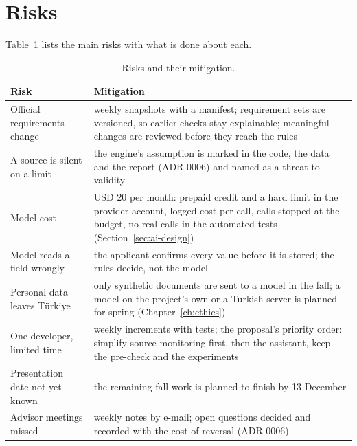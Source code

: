 \section{Risks}
Table~\ref{tab:risks} lists the main risks with what is done about each.

\begin{table}[ht]
  \centering
  \small
  \caption{Risks and their mitigation.}
  \label{tab:risks}
  \begin{tabularx}{\textwidth}{@{}>{\raggedright\arraybackslash}p{3.6cm}X@{}}
    \toprule
    Risk & Mitigation \\
    \midrule
    Official requirements change & weekly snapshots with a manifest; requirement sets are
      versioned, so earlier checks stay explainable; meaningful changes are reviewed before they
      reach the rules \\
    A source is silent on a limit & the engine's assumption is marked in the code, the data and
      the report (ADR 0006) and named as a threat to validity \\
    Model cost & USD 20 per month: prepaid credit and a hard limit in the provider account, logged cost per
      call, calls stopped at the budget, no real calls in the automated tests (Section~\ref{sec:ai-design}) \\
    Model reads a field wrongly & the applicant confirms every value before it is stored; the
      rules decide, not the model \\
    Personal data leaves Türkiye & only synthetic documents are sent to a model in the fall; a
      model on the project's own or a Turkish server is planned for spring
      (Chapter~\ref{ch:ethics}) \\
    One developer, limited time & weekly increments with tests; the proposal's priority order:
      simplify source monitoring first, then the assistant, keep the pre-check and the experiments \\
    Presentation date not yet known & the remaining fall work is planned to finish by 13 December \\
    Advisor meetings missed & weekly notes by e-mail; open questions decided and recorded with
      the cost of reversal (ADR 0006) \\
    \bottomrule
  \end{tabularx}
\end{table}
